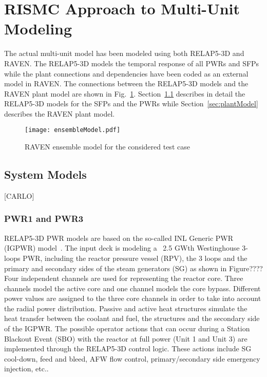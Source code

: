\section{RISMC Approach to Multi-Unit Modeling}
\label{sec:RISMC_MU_modeling}

The actual multi-unit model has been modeled using both RELAP5-3D and RAVEN.
The RELAP5-3D models the temporal response of all PWRs and SFPs while the plant 
connections and dependencies have been coded as an external model in RAVEN.
The connections between the RELAP5-3D models and the RAVEN plant model are 
shown in Fig.~\ref{fig:ensembleModel}.
Section~\ref{sec:systemModels} describes in detail the RELAP5-3D models for 
the SFPs and the PWRs while Section~\ref{sec:plantModel} describes the RAVEN plant model.
 
\begin{figure}
    \centering
    \texttt{[image: ensembleModel.pdf]}
    \caption{RAVEN ensemble model for the considered test case}
    \label{fig:ensembleModel}
\end{figure}

\subsection{System Models}
\label{sec:systemModels}
[CARLO]
\subsubsection{PWR1 and PWR3}
RELAP5-3D PWR models are based on the so-called INL Generic PWR (IGPWR) 
model~\cite{parisiExternalHazard,ronaldoRISMC}. 
The input deck is modeling a ~2.5 GWth Westinghouse 3-loops PWR, including the reactor 
pressure vessel (RPV), the 3 loops and the primary and secondary sides of the steam 
generators (SG) as shown in Figure????
Four independent channels are used for representing the reactor core. Three channels model 
the active core and one channel models the core bypass. Different power values are assigned 
to the three core channels in order to take into account the radial power distribution. 
Passive and active heat structures simulate the heat transfer between the coolant and fuel, 
the structures and the secondary side of the IGPWR.
The possible operator actions that can occur during a Station Blackout Event (SBO) with 
the reactor at full power (Unit 1 and Unit 3) are implemented through the RELAP5-3D control 
logic. These actions include SG cool-down, feed and bleed, AFW flow control, primary/secondary 
side emergency injection, etc..

